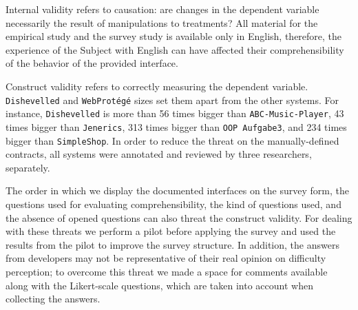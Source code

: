 Internal validity refers to causation: are changes in the dependent variable
necessarily the result of manipulations to treatments? All material for the
empirical study and the survey study is available only in English, therefore,
the experience of the Subject with English can have affected their
comprehensibility of the behavior of the provided interface.

Construct validity refers to correctly measuring the
dependent variable. \texttt{Dishevelled} and
\texttt{WebProt\'{e}g\'{e}} sizes set them apart from the other systems.
For instance, \texttt{Dishevelled} is more than 56 times bigger than \texttt{ABC-Music-Player}, 43
times bigger than \texttt{Jenerics}, 313 times bigger than \texttt{OOP Aufgabe3}, and 234 times
bigger than \texttt{SimpleShop}.
In order to reduce the threat on the manually-defined contracts,
all systems were annotated and reviewed by three researchers, separately.

The order in which we display the documented
interfaces on the survey form, the questions used for evaluating
comprehensibility, the kind of questions used, and the absence of opened questions
can also threat the construct validity. For dealing with these threats we
perform a pilot before applying the survey and used the results from the pilot
to improve the survey structure. In addition, the answers from developers may not be
representative of their real opinion on difficulty perception; to overcome this
threat we made a space for comments available along with the Likert-scale
questions, which are taken into account when collecting the answers.
